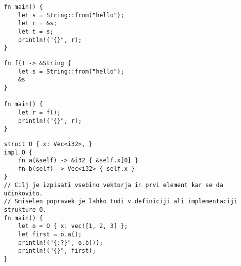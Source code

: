 \documentclass[11pt]{../izpit}
\begin{document}
\podnaloga
\begin{verbatim}
fn main() {
    let s = String::from("hello");
    let r = &s;
    let t = s;
    println!("{}", r);
}
\end{verbatim}

\podnaloga
\begin{verbatim}
fn f() -> &String {
    let s = String::from("hello");
    &s
}

fn main() {
    let r = f();
    println!("{}", r);
}
\end{verbatim}

\podnaloga
\begin{verbatim}
struct O { x: Vec<i32>, }
impl O {
    fn a(&self) -> &i32 { &self.x[0] }
    fn b(self) -> Vec<i32> { self.x }
}
// Cilj je izpisati vsebino vektorja in prvi element kar se da učinkovito.
// Smiselen popravek je lahko tudi v definiciji ali implementaciji strukture O.
fn main() {
    let o = O { x: vec![1, 2, 3] };
    let first = o.a();
    println!("{:?}", o.b());
    println!("{}", first);
}
\end{verbatim}
\end{document}
